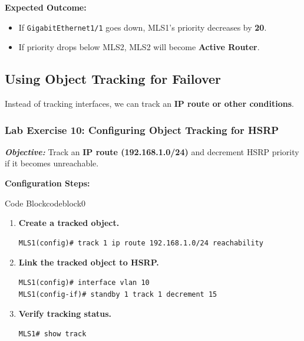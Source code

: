 \documentclass[a4paper]{book}
\begin{document}
\textbf{Expected Outcome:}
\begin{itemize}
\item If \texttt{GigabitEthernet1/1} goes down, MLS1’s priority decreases by \textbf{20}.
\item If priority drops below MLS2, MLS2 will become \textbf{Active Router}.
\end{itemize}

\subsection{Using Object Tracking for Failover}
Instead of tracking interfaces, we can track an \textbf{IP route or other conditions}.

\subsubsection{Lab Exercise 10: Configuring Object Tracking for HSRP}
\textbf{\textit{Objective:}} Track an \textbf{IP route (192.168.1.0/24)} and decrement HSRP 
priority if it becomes unreachable.

\vspace{1.5em}

\textbf{Configuration Steps:}

\vspace{1.5em}


\begin{ocg}{Code Block}{codeblock}{0}

\vspace{0.5cm}
\begin{enumerate}
\item \textbf{Create a tracked object.}
\begin{lstlisting}
MLS1(config)# track 1 ip route 192.168.1.0/24 reachability
\end{lstlisting}

\item \textbf{Link the tracked object to HSRP.}
\begin{lstlisting}
MLS1(config)# interface vlan 10
MLS1(config-if)# standby 1 track 1 decrement 15
\end{lstlisting}

\item \textbf{Verify tracking status.}
\begin{lstlisting}
MLS1# show track
\end{lstlisting}
\end{enumerate}
\end{ocg}
\end{document}
